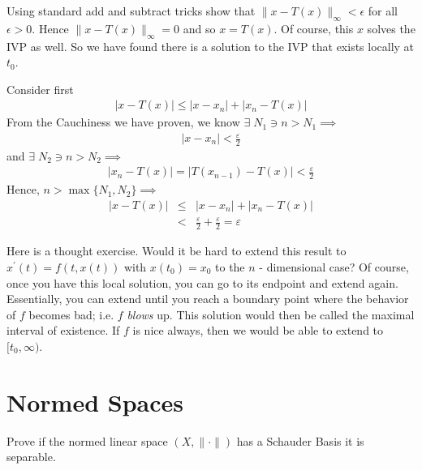 \documentclass[11pt]{SelfArxOneColBMN}
\begin{document}
\begin{exercise}
Using standard add and subtract tricks show that
$\|x - T(x)\|_\infty < \epsilon$ for all $\epsilon > 0$.
Hence $\|x - T(x)\|_\infty = 0$ and so $x = T(x)$.
Of course, this $x$ solves the IVP as well.
So we have found there is a solution to the IVP
that exists locally at $t_0$.
\end{exercise}

\begin{solution}
Consider first
\begin{eqnarray*}
  |x - T(x)| \leq |x - x_n| + |x_n - T(x)|
\end{eqnarray*}
From the Cauchiness we have proven, we know $\exists \; N_1 \ni n > N_1 \implies$
\begin{eqnarray*}
  |x - x_n| < \frac{\varepsilon}{2}
\end{eqnarray*}
and $\exists \; N_2 \ni n > N_2 \implies$
\begin{eqnarray*}
  |x_n - T(x)| = |T(x_{n-1}) - T(x)| < \frac{\varepsilon}{2}
\end{eqnarray*}
Hence, $n > \max\{N_1,N_2\} \implies$
\begin{eqnarray*}
  |x - T(x)| &\leq& |x - x_n| + |x_n - T(x)|\\
  &<& \frac{\varepsilon}{2} + \frac{\varepsilon}{2} = \varepsilon
\end{eqnarray*}
\end{solution}

\noindent
Here is a thought exercise.  Would it be hard to extend
this result to $x^\prime(t) = f(t,x(t))$ with $x(t_0) = x_0$ to the
$n$ - dimensional case?
Of course, once you have this local solution, you can go to its
endpoint and extend again.  Essentially, you can extend
until you reach a boundary point where the behavior of $f$
becomes bad; i.e. $f$ {\em blows} up.  This solution
would then be called the maximal interval of existence.
If $f$ is nice always, then we would be able to extend
to $[t_0, \infty)$.

\section{Normed Spaces}

\begin{exercise}
Prove if the normed linear space $(X, \| \cdot\|)$ has a
Schauder Basis it is separable.
\end{exercise}
\end{document}
